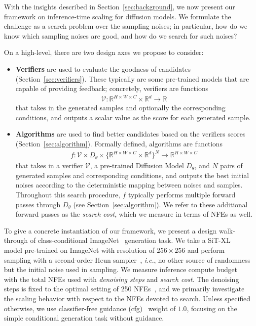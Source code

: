 With the insights described in Section~\ref{sec:background}, we now present our framework on inference-time scaling for diffusion models. We formulate the challenge as a search problem over the sampling noises; in particular, how do we know which sampling noises are good, and how do we search for such noises?

On a high-level, there are two design axes we propose to consider:
\begin{itemize}
    \item \textbf{Verifiers} are used to evaluate the goodness of candidates (Section~\ref{sec:verifiers}). These typically are some pre-trained models that are capable of providing feedback; concretely, verifiers are functions \begin{align}
        \mathcal{V}: \mathbb{R}^{H \times W \times C} \times \mathbb{R}^d \to \mathbb{R}
    \end{align}
    that takes in the generated samples and optionally the corresponding conditions, and outputs a scalar value as the score for each generated sample.
    \item \textbf{Algorithms} are used to find better candidates based on the verifiers scores (Section~\ref{sec:algorithm}). Formally defined, algorithms are functions \begin{align}
        f: \mathcal{V} \times D_\theta \times \{\mathbb{R}^{H \times W \times C} \times \mathbb{R}^d\}^N \to \mathbb{R}^{H\times W \times C}
    \end{align}
    that takes in a verifier $\mathcal{V}$, a pre-trained Diffusion Model $D_\theta$, and $N$ pairs of generated samples and corresponding conditions, and outputs the best initial noises according to the deterministic mapping between noises and samples. Throughout this search procedure, $f$ typically performs multiple forward passes through $D_\theta$ (see Section~\ref{sec:algorithm}). We refer to these additional forward passes as the \emph{search cost}, which we measure in terms of NFEs as well.
\end{itemize}


To give a concrete instantiation of our framework, we present a design walk-through of class-conditional ImageNet~\citep{deng2009imagenet} generation task. We take a SiT-XL~\citep{ma2024sit} model pre-trained on ImageNet with resolution of $256\times256$ and perform sampling with a second-order Heun sampler~\citep{karras2022elucidating}, \emph{i.e.}, no other source of randomness but the initial noise used in sampling. We measure inference compute budget with the total NFEs used with \textit{denoising steps} and \textit{search cost}. The denoising steps is fixed to the optimal setting of 250 NFEs~\citep{ma2024sit}, and we primarily investigate the scaling behavior with respect to the NFEs devoted to search. Unless specified otherwise, we use classifier-free guidance (cfg)~\citep{ho2022classifier} weight of $1.0$, focusing on the simple conditional generation task without guidance. 


